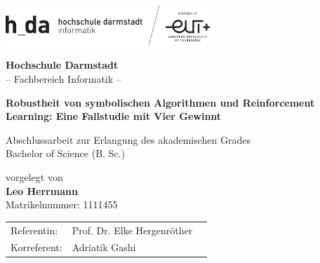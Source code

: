 \thispagestyle{empty}
\begin{titlepage}
 \begin{center}
    \includegraphics[width=7.7cm]{logo_h-da_neu} \\ 
  \end{center}

  \begin{center}
    \vspace{0.1cm}
    \huge \textbf{Hochschule Darmstadt}\\
    \vspace{0.4cm}
    \LARGE -- Fachbereich Informatik --
  \end{center}

  \vfill
  \vfill

  \begin{center}
    \LARGE \textbf{Robustheit von symbolischen Algorithmen und Reinforcement Learning: Eine Fallstudie mit Vier Gewinnt}
  \end{center} 
  
  \vfill
  \vfill

  \begin{center}
	\Large Abschlussarbeit zur Erlangung des akademischen Grades\\
	\vspace{0.3cm}
	\Large Bachelor of Science (B. Sc.)\\
  \end{center}

  \vfill

  \begin{center}
    \Large vorgelegt von\\
    \vspace{0.3cm}
    \Large \textbf{Leo Herrmann}\\
    \vspace{0.3cm}
    \normalsize Matrikelnummer: 1111455
  \end{center}
    \vfill
  \vfill

  \begin{center}
    \begin{tabular}{lll}
      Referentin:    & Prof. Dr. Elke Hergenröther \\
      Korreferent: & Adriatik Gashi				 \\
    \end{tabular}
  \end{center} 
\end{titlepage}
